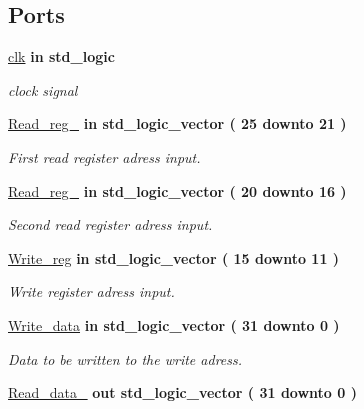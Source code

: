 \subsection*{\-Ports}
 \begin{DoxyCompactItemize}
\item 
\hyperlink{classregister__file_ae5e9fe74cd98136dd9bfe9fe944036a6}{clk}  {\bfseries {\bfseries in }} {\bfseries std\-\_\-logic } 
\begin{DoxyCompactList}\small\item\em clock signal \end{DoxyCompactList}\item 
\hyperlink{classregister__file_a5ed2152c539c2ceb0607980c27b3b855}{\-Read\-\_\-reg\-\_}  {\bfseries {\bfseries in }} {\bfseries std\-\_\-logic\-\_\-vector (   25    downto    21  ) } 
\begin{DoxyCompactList}\small\item\em \-First read register adress input. \end{DoxyCompactList}\item 
\hyperlink{classregister__file_a5f618c16ce27d5d1fbb470a067cd0ddf}{\-Read\-\_\-reg\-\_}  {\bfseries {\bfseries in }} {\bfseries std\-\_\-logic\-\_\-vector (   20    downto    16  ) } 
\begin{DoxyCompactList}\small\item\em \-Second read register adress input. \end{DoxyCompactList}\item 
\hyperlink{classregister__file_a2fed508e2f436c760a1584fb86fc8196}{\-Write\-\_\-reg}  {\bfseries {\bfseries in }} {\bfseries std\-\_\-logic\-\_\-vector (   15    downto    11  ) } 
\begin{DoxyCompactList}\small\item\em \-Write register adress input. \end{DoxyCompactList}\item 
\hyperlink{classregister__file_aa5f5791f55f67b340ebfeed6091de3ef}{\-Write\-\_\-data}  {\bfseries {\bfseries in }} {\bfseries std\-\_\-logic\-\_\-vector (   31    downto    0  ) } 
\begin{DoxyCompactList}\small\item\em \-Data to be written to the write adress. \end{DoxyCompactList}\item 
\hyperlink{classregister__file_aef4e31f5d5b779c9df8f6303cae69fb9}{\-Read\-\_\-data\-\_}  {\bfseries {\bfseries out }} {\bfseries std\-\_\-logic\-\_\-vector (   31    downto    0  ) } 

\end{DoxyCompactItemize}
